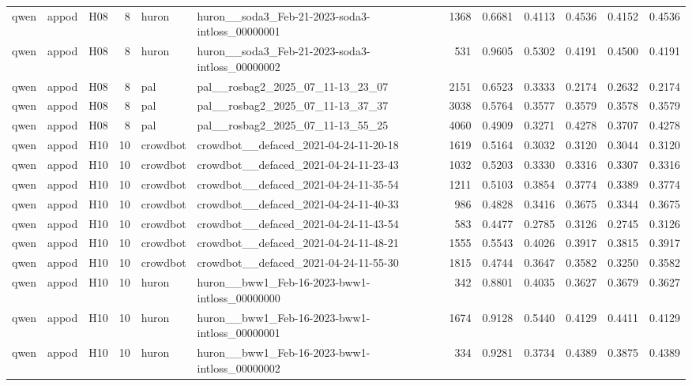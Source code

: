 \begin{table}[tbp]
\begin{tabular}{lllrllrrrrrr}
qwen & appod & H08 & 8 & huron & huron\_\_soda3\_Feb-21-2023-soda3-intloss\_00000001 & 1368 & 0.6681 & 0.4113 & 0.4536 & 0.4152 & 0.4536 \\
qwen & appod & H08 & 8 & huron & huron\_\_soda3\_Feb-21-2023-soda3-intloss\_00000002 & 531 & 0.9605 & 0.5302 & 0.4191 & 0.4500 & 0.4191 \\
qwen & appod & H08 & 8 & pal & pal\_\_rosbag2\_2025\_07\_11-13\_23\_07 & 2151 & 0.6523 & 0.3333 & 0.2174 & 0.2632 & 0.2174 \\
qwen & appod & H08 & 8 & pal & pal\_\_rosbag2\_2025\_07\_11-13\_37\_37 & 3038 & 0.5764 & 0.3577 & 0.3579 & 0.3578 & 0.3579 \\
qwen & appod & H08 & 8 & pal & pal\_\_rosbag2\_2025\_07\_11-13\_55\_25 & 4060 & 0.4909 & 0.3271 & 0.4278 & 0.3707 & 0.4278 \\
qwen & appod & H10 & 10 & crowdbot & crowdbot\_\_defaced\_2021-04-24-11-20-18 & 1619 & 0.5164 & 0.3032 & 0.3120 & 0.3044 & 0.3120 \\
qwen & appod & H10 & 10 & crowdbot & crowdbot\_\_defaced\_2021-04-24-11-23-43 & 1032 & 0.5203 & 0.3330 & 0.3316 & 0.3307 & 0.3316 \\
qwen & appod & H10 & 10 & crowdbot & crowdbot\_\_defaced\_2021-04-24-11-35-54 & 1211 & 0.5103 & 0.3854 & 0.3774 & 0.3389 & 0.3774 \\
qwen & appod & H10 & 10 & crowdbot & crowdbot\_\_defaced\_2021-04-24-11-40-33 & 986 & 0.4828 & 0.3416 & 0.3675 & 0.3344 & 0.3675 \\
qwen & appod & H10 & 10 & crowdbot & crowdbot\_\_defaced\_2021-04-24-11-43-54 & 583 & 0.4477 & 0.2785 & 0.3126 & 0.2745 & 0.3126 \\
qwen & appod & H10 & 10 & crowdbot & crowdbot\_\_defaced\_2021-04-24-11-48-21 & 1555 & 0.5543 & 0.4026 & 0.3917 & 0.3815 & 0.3917 \\
qwen & appod & H10 & 10 & crowdbot & crowdbot\_\_defaced\_2021-04-24-11-55-30 & 1815 & 0.4744 & 0.3647 & 0.3582 & 0.3250 & 0.3582 \\
qwen & appod & H10 & 10 & huron & huron\_\_bww1\_Feb-16-2023-bww1-intloss\_00000000 & 342 & 0.8801 & 0.4035 & 0.3627 & 0.3679 & 0.3627 \\
qwen & appod & H10 & 10 & huron & huron\_\_bww1\_Feb-16-2023-bww1-intloss\_00000001 & 1674 & 0.9128 & 0.5440 & 0.4129 & 0.4411 & 0.4129 \\
qwen & appod & H10 & 10 & huron & huron\_\_bww1\_Feb-16-2023-bww1-intloss\_00000002 & 334 & 0.9281 & 0.3734 & 0.4389 & 0.3875 & 0.4389 \\

\end{tabular}
\end{table}
